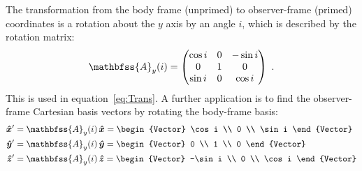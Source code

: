 The transformation from the body frame (unprimed) to observer-frame
(primed) coordinates is a rotation about the \(y\) axis by an angle
\(i\), which is described by the rotation matrix:
\begin{equation}
  \label{eq:Rotation-matrix-y}
  \mathbfss{A}_y(i) = 
   \begin{pmatrix}
    \cos i & 0 & -\sin i \\
    0 & 1 & 0 \\
    \sin i & 0 &\cos i 
  \end{pmatrix} \ .
\end{equation}
This is used in equation~\eqref{eq:Trans}.  A further application is
to find the observer-frame Cartesian basis vectors by rotating the
body-frame basis:
\begin{align}
  \label{eq:xunit-prime}
  \uvec{x}' &= \mathbfss{A}_y(i)\, \uvec{x}
              =
              \begin{Vector}
              \cos i \\ 0 \\ \sin i  
              \end{Vector}
  \\
  \label{eq:yunit-prime}
  \uvec{y}' &= \mathbfss{A}_y(i)\, \uvec{y}
              =
              \begin{Vector}
              0 \\ 1 \\ 0
              \end{Vector}
  \\
  \label{eq:zunit-prime}
  \uvec{z}' &= \mathbfss{A}_y(i)\, \uvec{z}
              =
              \begin{Vector}
              -\sin i \\ 0 \\ \cos i  
              \end{Vector}
\end{align}



